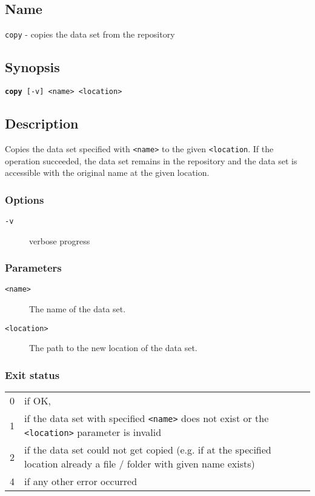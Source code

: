 \documentclass{article} %
\begin{document}
		\subsection*{Name}
		\texttt{copy} - copies the data set from the repository
		\subsection*{Synopsis}
		\texttt{\textbf{copy} [-v] <name> <location>}
		\subsection*{Description}
		Copies the data set specified with \texttt{<name>} to the given \texttt{<location}.
		If the operation succeeded, the data set remains in the repository and the data set is accessible with the original name at the given location.\\
		
		\noindent
		\subsubsection*{Options}
		\begin{description}
			\item[\texttt{-v}] verbose progress
		\end{description}
		
		\subsubsection*{Parameters}
		\begin{description}
			\item[\texttt{<name>}] The name of the data set.
			\item[\texttt{<location>}] The path to the new location of the data set.
		\end{description}
		\subsubsection*{Exit status}
		\begin{tabular}{ll}
			0 &  if OK,\\ 
			1 &  if the data set with specified \texttt{<name>} does not exist or the \texttt{<location>} parameter is invalid\\
			2 &  if the data set could not get copied (e.g. if at the specified location already a file / folder with given name exists)\\
			4 &  if any other error occurred\\
		\end{tabular}
		
\end{document}
